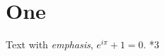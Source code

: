 \documentclass{article}
\begin{document}
\section{One}
Text with \emph{emphasis}, $e^{i\pi}+1=0$.
\showthe{}*3\relax
\typeout{\fmtname\space\fmtversion}
\end{document}
